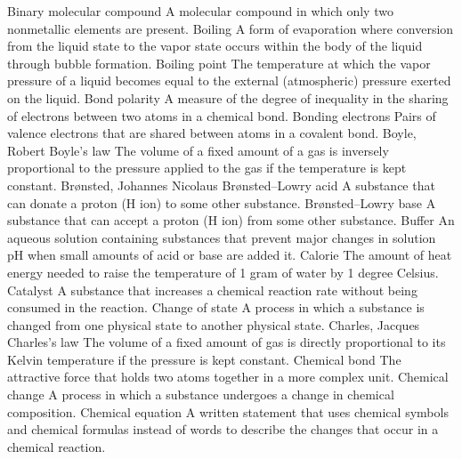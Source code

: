 \documentclass[10pt, roman]{article}
\begin{document}
Binary molecular compound A molecular compound in which only two nonmetallic elements are present.
Boiling A form of evaporation where conversion from the liquid state to the vapor state occurs within the body of the liquid through bubble formation.
Boiling point The temperature at which the vapor pressure of a liquid becomes equal to the external (atmospheric) pressure exerted on the liquid.
Bond polarity A measure of the degree of inequality in the sharing of electrons between two atoms in a chemical bond.
Bonding electrons Pairs of valence electrons that are shared between atoms in a covalent bond.
Boyle, Robert
Boyle’s law The volume of a fixed amount of a gas is inversely proportional to the pressure applied to the gas if the temperature is kept constant.
Brønsted, Johannes Nicolaus
Brønsted–Lowry acid A substance that can donate a proton (H ion) to some other substance.
Brønsted–Lowry base A substance that can accept a proton (H ion) from some other substance.
Buffer An aqueous solution containing substances that prevent major changes in solution pH when small amounts of acid or base are added it.
Calorie The amount of heat energy needed to raise the temperature of 1 gram of water by 1 degree Celsius.
Catalyst A substance that increases a chemical reaction rate without being consumed in the reaction.
Change of state A process in which a substance is changed from one physical state to another physical state.
Charles, Jacques
Charles’s law The volume of a fixed amount of gas is directly proportional to its Kelvin temperature if the pressure is kept constant.
Chemical bond The attractive force that holds two atoms together in a more complex unit.
Chemical change A process in which a substance undergoes a change in chemical composition.
Chemical equation A written statement that uses chemical symbols and chemical formulas instead of words to describe the changes that occur in a chemical reaction.
\end{document}
